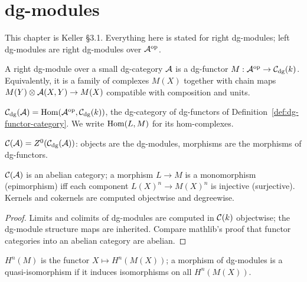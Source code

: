 \chapter{dg-modules}
\label{ch:modules}

This chapter is Keller \S 3.1. Everything here is stated for right dg-modules; left
dg-modules are right dg-modules over $\mathcal{A}^{\mathrm{op}}$.

\begin{definition}
\label{def:dg-module}
A right dg-module over a small dg-category $\mathcal{A}$ is a dg-functor
$M : \mathcal{A}^{\mathrm{op}} \to \mathcal{C}_{\mathrm{dg}}(k)$. Equivalently, it is a family of complexes $M(X)$ together with
chain maps $M(Y) \otimes \mathcal{A}(X,Y) \to M(X)$ compatible with composition and units.
\end{definition}

\begin{definition}
\label{def:dg-module-dgcat}
$\mathcal{C}_{\mathrm{dg}}(\mathcal{A}) = \operatorname{Hom}(\mathcal{A}^{\mathrm{op}}, \mathcal{C}_{\mathrm{dg}}(k))$, the dg-category of dg-functors of
Definition~\ref{def:dg-functor-category}. We write $\operatorname{Hom}(L,M)$ for its hom-complexes.
\end{definition}

\begin{definition}
\label{def:dg-module-cat}
$\mathcal{C}(\mathcal{A}) = Z^0(\mathcal{C}_{\mathrm{dg}}(\mathcal{A}))$: objects are the dg-modules, morphisms are the morphisms of
dg-functors.
\end{definition}

\begin{proposition}[$\Ch(\cA)$ is abelian]
\label{prop:dg-module-abelian}
$\Ch(\cA)$ is an abelian category; a morphism $L \to M$ is a monomorphism (epimorphism) iff
each component $L(X)^n \to M(X)^n$ is injective (surjective). Kernels and cokernels are
computed objectwise and degreewise.
\end{proposition}
\begin{proof}
Limits and colimits of dg-modules are computed in $\mathcal{C}(k)$ objectwise; the dg-module
structure maps are inherited. Compare mathlib's proof that functor categories into an
abelian category are abelian.
\end{proof}

\begin{definition}
\label{def:dg-module-homology}
$H^n(M)$ is the functor $X \mapsto H^n(M(X))$; a morphism of dg-modules is a
quasi-isomorphism if it induces isomorphisms on all $H^n(M(X))$.
\end{definition}

